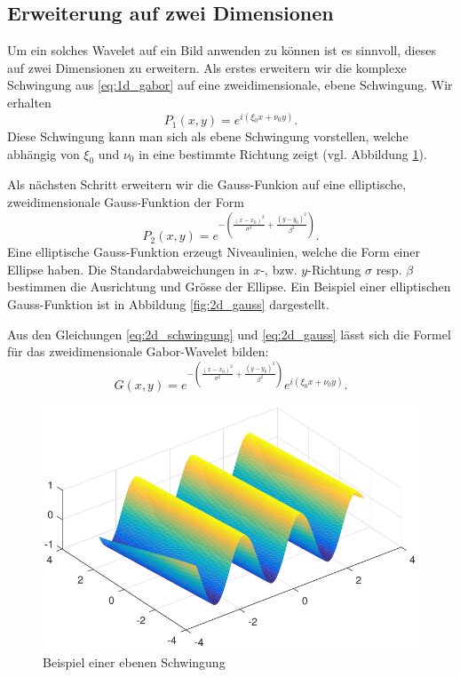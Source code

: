 \subsection{Erweiterung auf zwei Dimensionen}\label{subsec:2D}

Um ein solches Wavelet auf ein Bild anwenden zu können ist es sinnvoll, dieses auf zwei Dimensionen zu erweitern.
Als erstes erweitern wir die komplexe Schwingung aus \ref{eq:1d_gabor} auf eine zweidimensionale, ebene Schwingung.
Wir erhalten
\begin{equation}\label{eq:2d_schwingung}
P_1(x,y)= e^{i(\xi_{0}x+\nu_{0}y)}.
\end{equation}
Diese Schwingung kann man sich als ebene Schwingung vorstellen, welche abhängig von $\xi_0$ und $\nu_0$ in eine bestimmte Richtung zeigt (vgl. Abbildung \ref{fig:planarwave}).

Als nächsten Schritt erweitern wir die Gauss-Funkion auf eine elliptische, zweidimensionale Gauss-Funktion der Form
\begin{equation}\label{eq:2d_gauss}
P_2(x,y)=e^{-(\frac{(x-x_{0})^{2}}{\sigma^{2}}+\frac{(y-y_{0})^{2}}{\beta^{2}})}.
\end{equation}
Eine elliptische Gauss-Funktion erzeugt Niveaulinien, welche die Form einer Ellipse haben.
Die Standardabweichungen in $x$-, bzw. $y$-Richtung $\sigma$ resp. $\beta$ bestimmen die Ausrichtung und Grösse der Ellipse.
Ein Beispiel einer elliptischen Gauss-Funktion ist in Abbildung \ref{fig:2d_gauss} dargestellt.

Aus den Gleichungen \ref{eq:2d_schwingung} und \ref{eq:2d_gauss} lässt sich die Formel für das zweidimensionale Gabor-Wavelet bilden:
\begin{equation}\label{eq:2dgabor1}
G(x,y)= e^{-(\frac{(x-x_{0})^{2}}{\sigma^{2}}+\frac{(y-y_{0})^{2}}{\beta^{2}})}
e^{i(\xi_{0}x+\nu_{0}y)}.
\end{equation}

\begin{figure}
	\centering
	\includegraphics[width=0.7\linewidth]{./papers/visuell/images/planarwave.pdf}
	\caption{Beispiel einer ebenen Schwingung}
	\label{fig:planarwave}
\end{figure}

